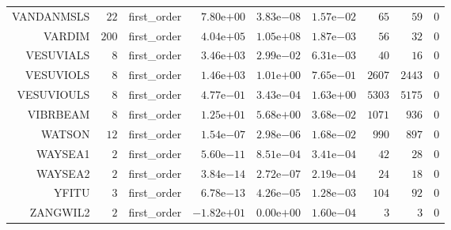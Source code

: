 \begin{longtable}{rrrrrrrrr}
VANDANMSLS & \(    22\) & first\_order & \( 7.80\)e\(+00\) & \( 3.83\)e\(-08\) & \( 1.57\)e\(-02\) & \(    65\) & \(    59\) & \(     0\) \\
VARDIM & \(   200\) & first\_order & \( 4.04\)e\(+05\) & \( 1.05\)e\(+08\) & \( 1.87\)e\(-03\) & \(    56\) & \(    32\) & \(     0\) \\
VESUVIALS & \(     8\) & first\_order & \( 3.46\)e\(+03\) & \( 2.99\)e\(-02\) & \( 6.31\)e\(-03\) & \(    40\) & \(    16\) & \(     0\) \\
VESUVIOLS & \(     8\) & first\_order & \( 1.46\)e\(+03\) & \( 1.01\)e\(+00\) & \( 7.65\)e\(-01\) & \(  2607\) & \(  2443\) & \(     0\) \\
VESUVIOULS & \(     8\) & first\_order & \( 4.77\)e\(-01\) & \( 3.43\)e\(-04\) & \( 1.63\)e\(+00\) & \(  5303\) & \(  5175\) & \(     0\) \\
VIBRBEAM & \(     8\) & first\_order & \( 1.25\)e\(+01\) & \( 5.68\)e\(+00\) & \( 3.68\)e\(-02\) & \(  1071\) & \(   936\) & \(     0\) \\
WATSON & \(    12\) & first\_order & \( 1.54\)e\(-07\) & \( 2.98\)e\(-06\) & \( 1.68\)e\(-02\) & \(   990\) & \(   897\) & \(     0\) \\
WAYSEA1 & \(     2\) & first\_order & \( 5.60\)e\(-11\) & \( 8.51\)e\(-04\) & \( 3.41\)e\(-04\) & \(    42\) & \(    28\) & \(     0\) \\
WAYSEA2 & \(     2\) & first\_order & \( 3.84\)e\(-14\) & \( 2.72\)e\(-07\) & \( 2.19\)e\(-04\) & \(    24\) & \(    18\) & \(     0\) \\
YFITU & \(     3\) & first\_order & \( 6.78\)e\(-13\) & \( 4.26\)e\(-05\) & \( 1.28\)e\(-03\) & \(   104\) & \(    92\) & \(     0\) \\
ZANGWIL2 & \(     2\) & first\_order & \(-1.82\)e\(+01\) & \( 0.00\)e\(+00\) & \( 1.60\)e\(-04\) & \(     3\) & \(     3\) & \(     0\) \\\hline
\end{longtable}
